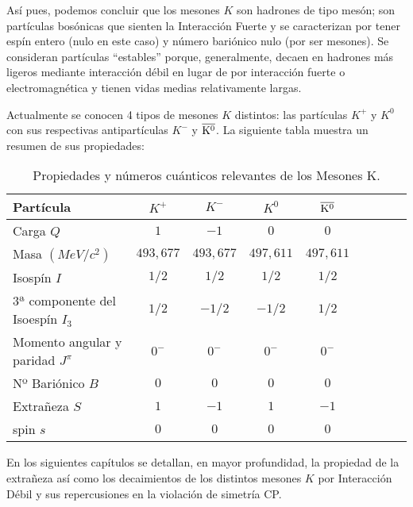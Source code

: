 Así pues, podemos concluir que los mesones $K$ son hadrones de tipo mesón; son partículas bosónicas que sienten la Interacción Fuerte y se caracterizan por tener espín entero (nulo en este caso) y número bariónico nulo (por ser mesones). Se consideran partículas ``estables'' porque, generalmente, decaen en hadrones más ligeros mediante interacción débil en lugar de por interacción fuerte o electromagnética y tienen vidas medias relativamente largas.

Actualmente se conocen 4 tipos de mesones $K$ distintos: las partículas $K^+$ y $K^0$ con sus respectivas antipartículas $K^-$ y $\overline{\rm K^0}$. La siguiente tabla muestra un resumen de sus propiedades:\\

\begin{table}[h]
	\centering
	\begin{tabular}{l*{7}{c}r}
\hline
Partícula & $K^+$ & $K^-$ & $K^0$ & $\overline{\rm K^0}$ \\ 
\hline
Carga $Q$ & $1$ & $-1$ & $0$ & $0$\\
Masa $(MeV/c^2)$ & $493,677$ & $493,677$ & $497,611$ & $497,611$\\
Isospín $I$ & $1/2$ & $1/2$ & $1/2$ & $1/2$ \\
3ª componente del Isoespín $I_3$ & $1/2$ & $-1/2$ & $-1/2$ & $1/2$ \\
Momento angular y paridad $J^\pi$ & $0^-$ & $0^-$ & $0^-$ & $0^-$ \\
Nº Bariónico $B$ & $0$ & $0$ & $0$ & $0$\\
Extrañeza $S$ & $1$ & $-1$ & $1$ & $-1$\\
spin $s$ & $0$ & $0$ & $0$ & $0$\\ 
\hline
	\end{tabular}
\caption{Propiedades y números cuánticos relevantes de los Mesones K.\protect\footnotemark}
\label{tab:propiedades}
\end{table}


En los siguientes capítulos se detallan, en mayor profundidad, la propiedad de la extrañeza así como los decaimientos de los distintos mesones $K$ por Interacción Débil y sus repercusiones en la violación de simetría CP.




